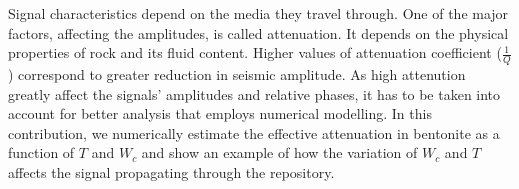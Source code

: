 \documentclass[letterpaper,11pt]{article}
\begin{document}
\quad Signal characteristics depend on the media they travel through. One of the major factors, affecting the amplitudes, is called attenuation. It depends on the physical properties of rock and its fluid content. Higher values of attenuation coefficient ($\frac{1}{Q}$) correspond to greater reduction in seismic amplitude. As high attenution greatly affect the signals' amplitudes and relative phases, it has to be taken into account for better analysis that employs numerical modelling. 
In this contribution, we numerically estimate the effective attenuation in bentonite as a function of $T$ and $W_{c}$ and show an example of how the variation of $W_{c}$ and $T$ affects the signal propagating through the repository.
\end{document}
